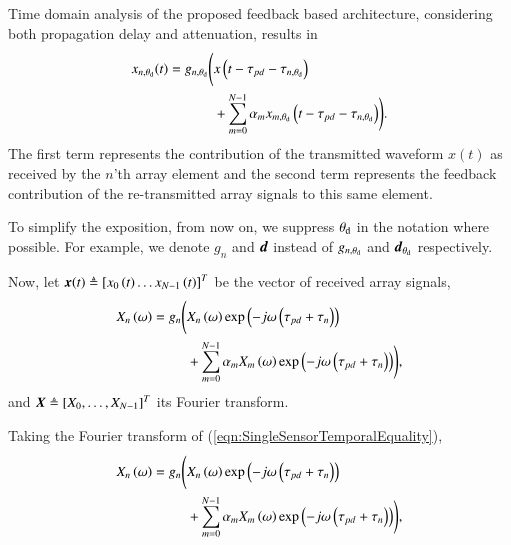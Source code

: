 Time domain analysis of the proposed feedback based architecture, considering both propagation delay and attenuation, results in 
\begin{equation}
    \label{eqn:SingleSensorTemporalEquality}
        \begin{split}
            x_{n,\thetaD}(t) = g_{n,\thetaD}\Bigg{(}&x\rBrace{t-\tau_{pd}-\tau_{n,\thetaD}}\\
            &+\sum_{m=0}^{N-1}{\alpha_{m}x_{m,\thetaD}\rBrace{t-\tau_{pd}-\tau_{n,\thetaD}}}\Bigg{)}.
        \end{split}
\end{equation}
The first term represents the contribution of the transmitted waveform $x(t)$ as received by the $n$'th array element and the second term represents the feedback contribution of the re-transmitted array signals to this same element.
\par To simplify the exposition, from now on, we suppress $\theta_{\text{d}}$ in the notation where possible. For example, we denote $g_n$ and $\boldsymbol{d}$ instead of $g_{n,\theta_{\text{d}}}$ and $\boldsymbol{d}_{\theta_{\text{d}}}$ respectively. 
\par Now, let $\boldsymbol{x}{\left({t}\right)}\triangleq\left[{x_{0}\left({t}\right)\hdots{}x_{N-1}\left({t}\right)}\right]^{T}$ be the vector of received array signals, 
\begin{equation}
    \label{eqn_singleSensorFourier}
        \begin{split}
            \F{x}_{n}\rBrace{\omega} =
            g_n\Bigg( & \F{x}_{n}\rBrace{\omega}
            \exp\rBrace{-j\omega\rBrace{\tau_{pd}+\tau_{n}}}
            \\&+\sum_{m=0}^{N-1}
            {
            \alpha_{m}\F{x}_{m}\rBrace{\omega}
            \exp\rBrace{-j\omega\rBrace{\tau_{pd}+\tau_{n}}}
            }\Bigg), 
        \end{split}
\end{equation}
and  $\vecnot{\F{x}}\triangleq\vBrace{\F{x}_{0},\hdots,\F{x}_{N-1}}^{T}$ its Fourier transform. 
\par Taking the Fourier transform of (\ref{eqn:SingleSensorTemporalEquality}),
\begin{equation}
    \label{eqn_singleSensorFourier}
        \begin{split}
            \F{x}_{n}\rBrace{\omega} =
            g_n\Bigg( & \F{x}_{n}\rBrace{\omega}
            \exp\rBrace{-j\omega\rBrace{\tau_{pd}+\tau_{n}}}
            \\&+\sum_{m=0}^{N-1}
            {
            \alpha_{m}\F{x}_{m}\rBrace{\omega}
            \exp\rBrace{-j\omega\rBrace{\tau_{pd}+\tau_{n}}}
            }\Bigg),
        \end{split}
\end{equation}
